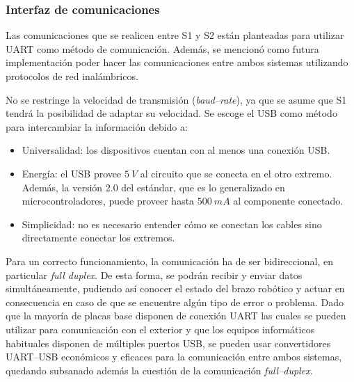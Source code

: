 \subsubsection{Interfaz de comunicaciones}
Las comunicaciones que se realicen entre \ac{S1} y \ac{S2} están planteadas para utilizar \ac{UART} como método de comunicación. Además, se mencionó como futura implementación poder hacer las comunicaciones entre ambos sistemas utilizando protocolos de red inalámbricos.

No se restringe la velocidad de transmisión (\textit{baud--rate}), ya que se asume que \ac{S1} tendrá la posibilidad de adaptar su velocidad. Se escoge el \ac{USB} como método para intercambiar la información debido a:

\begin{itemize}
    \item Universalidad: los dispositivos cuentan con al menos una conexión \ac{USB}.
    \item Energía: el \ac{USB} provee $5~V$ al circuito que se conecta en el otro extremo. Además, la versión 2.0 del estándar, que es lo generalizado en microcontroladores, puede proveer hasta $500~mA$ al componente conectado.
    \item Simplicidad: no es necesario entender cómo se conectan los cables sino directamente conectar los extremos.
\end{itemize}

Para un correcto funcionamiento, la comunicación ha de ser bidireccional, en particular \textit{full duplex}. 
De esta forma, se podrán recibir y enviar datos simultáneamente, pudiendo así conocer el estado del brazo robótico 
y actuar en consecuencia en caso de que se encuentre algún tipo de error o problema. 
Dado que la mayoría de placas base disponen de conexión \ac{UART} las cuales se pueden
utilizar para comunicación con el exterior y que los equipos informáticos habituales
disponen de múltiples puertos \ac{USB}, se pueden usar convertidores \ac{UART}--\ac{USB}
económicos y eficaces para la comunicación entre ambos sistemas, quedando subsanado además
la cuestión de la comunicación \textit{full--duplex}.